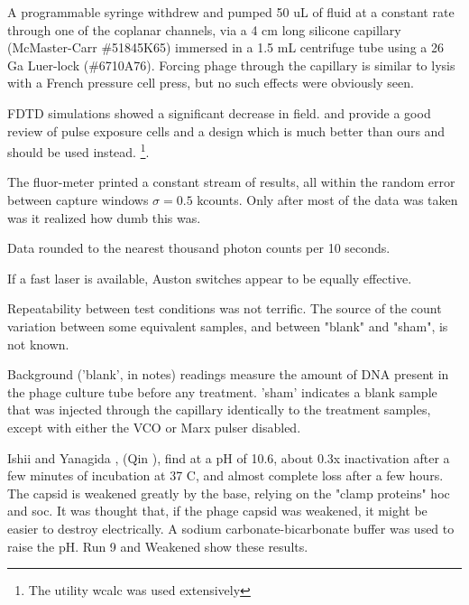 \documentclass[paper.tex]{subfiles}
\begin{document}
\begin{multicols}{1}
A programmable syringe withdrew and pumped 50 uL of fluid at a constant rate through one of the coplanar channels, via a 4 cm long silicone capillary (McMaster-Carr \#51845K65) immersed in a 1.5 mL centrifuge tube using a 26 Ga Luer-lock (\#6710A76). Forcing phage through the capillary is similar to lysis with a French pressure cell press, but no such effects were obviously seen.

 FDTD simulations showed a significant decrease in field. \cite{Microchamber2011} and \cite{Characterization2012} provide a good review of pulse exposure cells and a design which is much better than ours and should be used instead. \cite{Electromagnetic1989} \footnote{The utility wcalc was used extensively}.






%


The fluor-meter printed a constant stream of results, all within the random error between capture windows $\sigma=0.5$ kcounts. Only after most of the data was taken was it realized how dumb this was.


Data rounded to the nearest thousand photon counts per 10 seconds. %

If a fast laser is available, Auston switches appear to be equally effective.


Repeatability between test conditions was not terrific. The source of the  count variation between some equivalent samples, and between "blank" and "sham", is not known.

Background ('blank', in notes) readings measure the amount of DNA present in the phage culture tube before any treatment. 'sham' indicates a blank sample that was injected through the capillary identically to the treatment samples, except with either the VCO or Marx pulser disabled.

Ishii and Yanagida \cite{two1977}, (Qin \cite{Structure2010}), find at a pH of 10.6, about 0.3x inactivation after a few minutes of incubation at 37 C, and almost complete loss after a few hours. The capsid is weakened greatly by the base, relying on the "clamp proteins" hoc and soc. It was thought that, if the phage capsid was weakened, it might be easier to destroy electrically. A sodium carbonate-bicarbonate buffer was used to raise the pH. Run 9 and Weakened show these results. 


\end{multicols}
\end{document}
